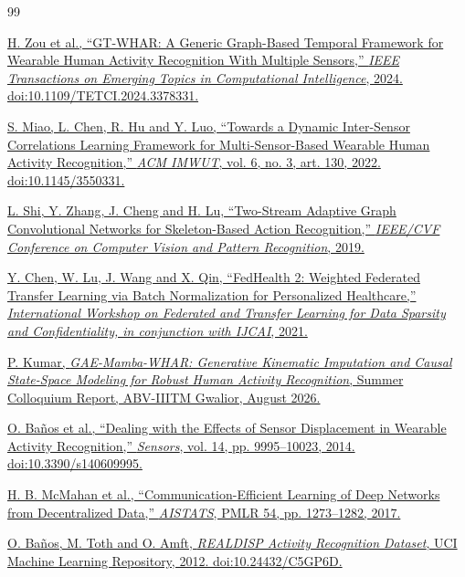 \documentclass[10pt,a4paper,oneside,openany]{report}
\begin{document}
\cleardoublepage
\begin{thebibliography}{99}
\raggedright
\setlength{\itemsep}{4pt}

\href{https://doi.org/10.1109/TETCI.2024.3378331}{%
H. Zou et al.,
``GT-WHAR: A Generic Graph-Based Temporal Framework for Wearable Human Activity Recognition With Multiple Sensors,''
\emph{IEEE Transactions on Emerging Topics in Computational Intelligence}, 2024.
doi:10.1109/TETCI.2024.3378331.}

\href{https://doi.org/10.1145/3550331}{%
S. Miao, L. Chen, R. Hu and Y. Luo,
``Towards a Dynamic Inter-Sensor Correlations Learning Framework for Multi-Sensor-Based Wearable Human Activity Recognition,''
\emph{ACM IMWUT}, vol. 6, no. 3, art. 130, 2022.
doi:10.1145/3550331.}

\href{https://openaccess.thecvf.com/content_CVPR_2019/html/Shi_Two-Stream_Adaptive_Graph_Convolutional_Networks_for_Skeleton-Based_Action_Recognition_CVPR_2019_paper.html}{%
L. Shi, Y. Zhang, J. Cheng and H. Lu,
``Two-Stream Adaptive Graph Convolutional Networks for Skeleton-Based Action Recognition,''
\emph{IEEE/CVF Conference on Computer Vision and Pattern Recognition}, 2019.}

\href{https://federated-learning.org/fl-ijcai-2021/FTL-IJCAI21_paper_4.pdf}{%
Y. Chen, W. Lu, J. Wang and X. Qin,
``FedHealth 2: Weighted Federated Transfer Learning via Batch Normalization for Personalized Healthcare,''
\emph{International Workshop on Federated and Transfer Learning for Data Sparsity and Confidentiality, in conjunction with IJCAI}, 2021.}

\href{https://github.com/ksprabhatkumar/GAE_Mamba_WHAR/blob/main/report.pdf}{%
P. Kumar,
\emph{GAE-Mamba-WHAR: Generative Kinematic Imputation and Causal State-Space Modeling for Robust Human Activity Recognition},
Summer Colloquium Report, ABV-IIITM Gwalior, August 2026.}

\href{https://doi.org/10.3390/s140609995}{%
O. Ba\~nos et al.,
``Dealing with the Effects of Sensor Displacement in Wearable Activity Recognition,''
\emph{Sensors}, vol. 14, pp. 9995--10023, 2014.
doi:10.3390/s140609995.}

\href{https://proceedings.mlr.press/v54/mcmahan17a.html}{%
H. B. McMahan et al.,
``Communication-Efficient Learning of Deep Networks from Decentralized Data,''
\emph{AISTATS}, PMLR 54, pp. 1273--1282, 2017.}

\href{https://doi.org/10.24432/C5GP6D}{%
O. Ba\~nos, M. Toth and O. Amft,
\emph{REALDISP Activity Recognition Dataset}, UCI Machine Learning Repository, 2012.
doi:10.24432/C5GP6D.}

\end{thebibliography}
\end{document}
